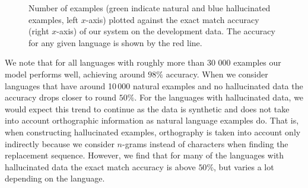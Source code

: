 \documentclass[11pt,a4paper]{article}
\begin{document}
\begin{figure}
\caption{\label{fig:data_acc} Number of examples (green indicate
natural and blue hallucinated examples, left $x$-axis) plotted against
the exact match accuracy (right $x$-axis) of our system on the
development data. The accuracy for any given language is shown by the
red line.}
\end{figure}

We note that for all languages with roughly more than 30 000 examples
our model performs well, achieving around $98\%$ accuracy. When
we consider languages that have around 10\,000 natural examples and
no hallucinated data the accuracy drops closer to round $50\%$. For
the languages with hallucinated data, we would expect this trend to
continue as the data is synthetic and does not take into account
orthographic information as natural language examples do.  That is,
when constructing hallucinated examples, orthography is taken into
account only indirectly because we consider $n$-grams instead of
characters when finding the replacement sequence. However, we find
that for many of the languages with hallucinated data the exact match
accuracy is above $50\%$, but varies a lot depending on the language.
\end{document}
